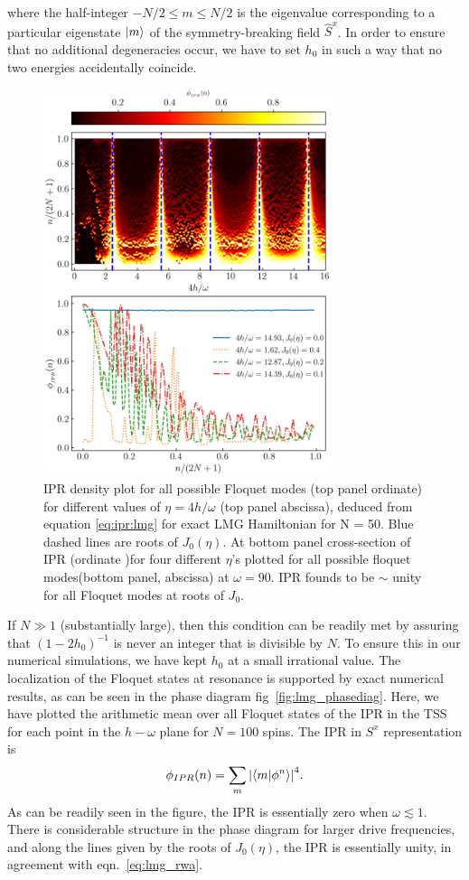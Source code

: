 \documentclass[%
reprint,
superscriptaddress,
linenumbers,
amsmath,amssymb,
aps,
prb,
showkeys,
]{revtex4-2}
\begin{document}
	where the half-integer $-N/2\leq m \leq N/2$ is the eigenvalue corresponding to a particular eigenstate $\ket{m}$ of the symmetry-breaking field $\hat{S}^x$. In order to ensure that no additional degeneracies occur, we have to set $h_0$ in  such a way that no two energies accidentally coincide.
		\begin{figure}[t!]
		\centering
		\includegraphics[width = 8.5cm]{ipr_exact_dynm_N50_frq_90_.jpeg}
		\caption{IPR density plot for all possible Floquet modes (top panel ordinate) for different values of $\eta = 4h/\omega$ (top panel abscissa), deduced from equation \ref{eq:ipr:lmg} for exact LMG Hamiltonian for N = 50. Blue dashed lines are roots of $J_0(\eta)$. At bottom panel cross-section of IPR (ordinate )for four different $\eta$'s plotted for all possible floquet modes(bottom panel, abscissa) at $\omega=90$. IPR founds to be $\sim$ unity for all Floquet modes at roots of $J_0$.}
		\label{fig:lmg_ipr_exact}
	\end{figure}
	If $N\gg 1$ (substantially large), then this condition can be readily met by assuring that $(1-2h_0)^{-1}$ is never an integer that is divisible by $N$. To ensure this in our numerical simulations, we have kept $h_0$ at a small irrational value.
		The localization of the Floquet states at resonance is supported by exact numerical results, as can be seen in the phase diagram fig~\ref{fig:lmg_phasediag}. Here, we have plotted the arithmetic mean over all Floquet states of the IPR 
		in the TSS for each point in the $h-\omega$ plane for $N=100$ spins.  The IPR in $S^x$ representation is
		\begin{equation}
			\phi_{IPR}(n) = \sum_m \abs{\ip{m}{\phi^n}}^4.
			\label{eq:ipr:lmg}
		\end{equation}
		As can be readily seen in the figure, the IPR is essentially zero when  $\omega \lesssim 1$. There is considerable structure in the phase diagram for larger drive frequencies, and along the lines given by the roots of $J_0(\eta)$, the IPR is essentially unity, in agreement with eqn.~\ref{eq:lmg_rwa}.
		
\end{document}

